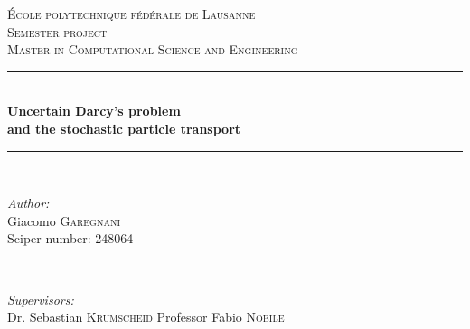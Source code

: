 \begin{titlepage}
\newcommand{\HRule}{\rule{\linewidth}{0.5mm}} %

\center %
 

\vspace{3cm}
\textsc{\LARGE École polytechnique fédérale de Lausanne}\\[1.5cm] %
\textsc{\Large Semester project}\\[0.5cm] %
\textsc{\large Master in Computational Science and Engineering}\\[0.5cm] %


\HRule \\[0.4cm]
{ \huge \bfseries Uncertain Darcy's problem \\ and the stochastic particle transport}\\[0.4cm] %
\HRule \\[1.5cm]
 

\begin{minipage}{0.4\textwidth}
\begin{flushleft} \large
\emph{Author:}\\
Giacomo \textsc{Garegnani} \\ Sciper number: 248064%
\end{flushleft}
\end{minipage}
~
\begin{minipage}{0.4\textwidth}
\begin{flushright} \large
\emph{Supervisors:} \\
Dr. Sebastian \textsc{Krumscheid} Professor Fabio \textsc{Nobile}%
\end{flushright}
\end{minipage}\\[10cm]


\end{titlepage}
